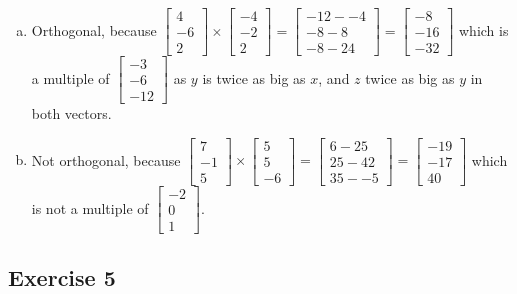 \documentclass[11pt]{article}
\begin{document}
\begin{enumerate}[a.]
	\item %
	Orthogonal, because $\begin{bmatrix}
	4 \\ -6 \\ 2
	\end{bmatrix}\times\begin{bmatrix}
	-4 \\ -2 \\ 2
	\end{bmatrix}=
	\begin{bmatrix}
	-12--4 \\ -8-8 \\ -8-24
	\end{bmatrix}=
	\begin{bmatrix}
	-8 \\ -16 \\ -32
	\end{bmatrix}$ which is a multiple of $
	\begin{bmatrix}
	-3 \\ -6 \\ -12
	\end{bmatrix}$ as $y$ is twice as big as $x$, and $z$ twice as big as $y$ in both vectors.
	
	\item %
	Not orthogonal, because $\begin{bmatrix}
	7 \\ -1 \\ 5
	\end{bmatrix}\times\begin{bmatrix}
	5 \\ 5 \\ -6
	\end{bmatrix}=
	\begin{bmatrix}
	6 - 25 \\ 25 -42 \\ 35--5
	\end{bmatrix}=
	\begin{bmatrix}
	-19 \\ -17 \\ 40
	\end{bmatrix}$ which is not a multiple of $
	\begin{bmatrix}
	-2 \\ 0 \\ 1
	\end{bmatrix}$.
\end{enumerate}

\subsection{Exercise 5}
\end{document}
